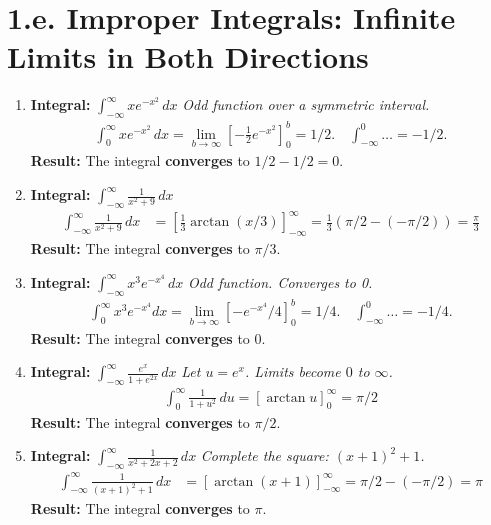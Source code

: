 \documentclass[12pt]{article}
\newcommand{\problemsettitle}[1]{\section*{#1}}
\begin{document}
\newpage
\problemsettitle{1.e. Improper Integrals: Infinite Limits in Both Directions}
\begin{enumerate}
    \item \textbf{Integral: } $\displaystyle \int_{-\infty}^{\infty} x e^{-x^2} \,dx$
    \textit{Odd function over a symmetric interval.}
    \begin{align*}
        \int_{0}^{\infty} x e^{-x^2} \,dx = \lim_{b \to \infty} [-\frac{1}{2}e^{-x^2}]_0^b = 1/2. \quad \int_{-\infty}^{0} \dots = -1/2.
    \end{align*}
    \textbf{Result:} The integral \textbf{converges} to $1/2 - 1/2 = 0$.

    \item \textbf{Integral: } $\displaystyle \int_{-\infty}^{\infty} \frac{1}{x^2+9} \,dx$
    \begin{align*}
        \int_{-\infty}^{\infty} \frac{1}{x^2+9} \,dx &= [\frac{1}{3}\arctan(x/3)]_{-\infty}^{\infty} = \frac{1}{3}(\pi/2 - (-\pi/2)) = \frac{\pi}{3}
    \end{align*}
    \textbf{Result:} The integral \textbf{converges} to $\pi/3$.

    \item \textbf{Integral: } $\displaystyle \int_{-\infty}^{\infty} x^3 e^{-x^4} \,dx$
    \textit{Odd function. Converges to 0.}
    \begin{align*}
        \int_0^\infty x^3 e^{-x^4} dx = \lim_{b\to\infty} [-e^{-x^4}/4]_0^b = 1/4. \quad \int_{-\infty}^0 \dots = -1/4.
    \end{align*}
    \textbf{Result:} The integral \textbf{converges} to $0$.

    \item \textbf{Integral: } $\displaystyle \int_{-\infty}^{\infty} \frac{e^x}{1+e^{2x}} \,dx$
    \textit{Let $u=e^x$. Limits become $0$ to $\infty$.}
    \begin{align*}
        \int_{0}^{\infty} \frac{1}{1+u^2} \,du = [\arctan u]_0^\infty = \pi/2
    \end{align*}
    \textbf{Result:} The integral \textbf{converges} to $\pi/2$.

    \item \textbf{Integral: } $\displaystyle \int_{-\infty}^{\infty} \frac{1}{x^2+2x+2} \,dx$
    \textit{Complete the square: $(x+1)^2+1$.}
    \begin{align*}
        \int_{-\infty}^{\infty} \frac{1}{(x+1)^2+1} \,dx &= [\arctan(x+1)]_{-\infty}^\infty = \pi/2 - (-\pi/2) = \pi
    \end{align*}
    \textbf{Result:} The integral \textbf{converges} to $\pi$.


\end{enumerate}
\end{document}
